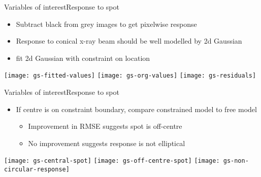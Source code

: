\documentclass[8pt]{beamer}
\begin{document}
\begin{frame}{Variables of interest}{Response to spot}
	\begin{itemize}
		\item Subtract black from grey images to get pixelwise response
		\item Response to conical x-ray beam should be well modelled by 2d Gaussian
		\item fit 2d Gaussian with constraint on location				%
	\end{itemize}
	
	\begin{center}
		\texttt{[image: gs-fitted-values]}
		\texttt{[image: gs-org-values]}			%
		\texttt{[image: gs-residuals]}
	\end{center}
	
\end{frame}		
		
\begin{frame}{Variables of interest}{Response to spot}
	\begin{itemize}
		\item If centre is on constraint boundary, compare constrained model to free model
		\begin{itemize}
			\item Improvement in RMSE suggests spot is off-centre
			\item No improvement suggests response is not elliptical
		\end{itemize}
	\end{itemize}			%
	
	\begin{center}
		\texttt{[image: gs-central-spot]}
		\texttt{[image: gs-off-centre-spot]}			%
		\texttt{[image: gs-non-circular-response]}
	\end{center}

\end{frame}
 

\end{document}
